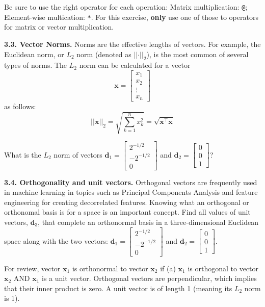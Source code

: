 \documentclass[
  letterpaper,
  DIV=11,
  numbers=noendperiod]{scrartcl}
\begin{document}
Be sure to use the right operator for each operation: Matrix
multiplication: \texttt{@}; Element-wise multication: \texttt{*}. For
this exercise, \textbf{only} use one of those to operators for matrix or
vector multiplication.

\textbf{3.3. Vector Norms.} Norms are the effective lengths of vectors.
For example, the Euclidean norm, or \(L_2\) norm (denoted as
\(||\mathbf{\cdot}||_2\)), is the most common of several types of norms.
The \(L_2\) norm can be calculated for a vector
\[\mathbf{x} =  \begin{bmatrix} x_1 \\ x_2 \\ \vdots \\ x_n \end{bmatrix}\]
as follows:
\[||\mathbf{x}||_2 = \sqrt{\displaystyle \sum_{k=1}^n x_k^2} = \sqrt{\mathbf{x}^{\top}\mathbf{x}}\]

What is the \(L_2\) norm of vectors
\(\mathbf{d}_1 =  \begin{bmatrix} 2^{-1/2} \\ -2^{-1/2} \\ 0 \end{bmatrix}\)
and \(\mathbf{d}_2 = \begin{bmatrix} 0 \\ 0 \\ 1 \end{bmatrix}\)?

\textbf{3.4. Orthogonality and unit vectors.} Orthogonal vectors are
frequently used in machine learning in topics such as Principal
Components Analysis and feature engineering for creating decorrelated
features. Knowing what an orthogonal or orthonomal basis is for a space
is an important concept. Find all values of unit vectors,
\(\mathbf{d}_3\), that complete an orthonormal basis in a
three-dimensional Euclidean space along with the two vectors:
\(\mathbf{d}_1 =  \begin{bmatrix} 2^{-1/2} \\ -2^{-1/2} \\ 0 \end{bmatrix}\)
and \(\mathbf{d}_2 = \begin{bmatrix} 0 \\ 0 \\ 1 \end{bmatrix}\).

For review, vector \(\mathbf{x}_1\) is orthonormal to vector
\(\mathbf{x}_2\) if (a) \(\mathbf{x}_1\) is orthogonal to vector
\(\mathbf{x}_2\) AND \(\mathbf{x}_1\) is a unit vector. Orthogonal
vectors are perpendicular, which implies that their inner product is
zero. A unit vector is of length 1 (meaning its \(L_2\) norm is 1).
\end{document}
